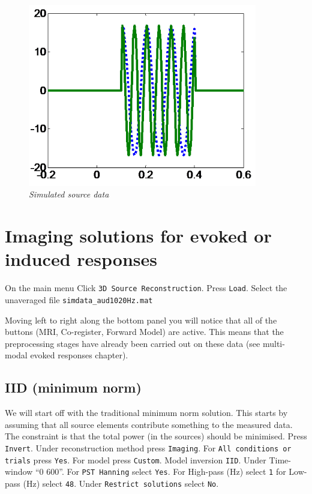 \begin{figure}
\begin{center}
\includegraphics[width=100mm]{meg_sloc/slide1}
\caption{\em Simulated source data \label{meg_sloc:fig:1}}
\end{center}
\end{figure}


\section{Imaging solutions for evoked or induced responses}

On the main menu Click \texttt{3D Source Reconstruction}. Press \texttt{Load}. Select the unaveraged file \texttt{simdata\_aud1020Hz.mat}

Moving left to right along the bottom panel you will notice that all of the buttons (MRI, Co-register, Forward Model) are active. This means that the preprocessing stages have already been carried out on these data (see multi-modal evoked responses chapter).

\subsection{IID (minimum norm)}
We will start off with the traditional minimum norm solution. This starts by assuming that all source elements contribute something to the measured data. The constraint is that the total power (in the sources) should be minimised.
Press \texttt{Invert}. Under reconstruction method press \texttt{Imaging}. For \texttt{All conditions or trials} press \texttt{Yes}. For model press \texttt{Custom}. Model inversion \texttt{IID}. Under Time-window ``0 600''. For \texttt{PST Hanning} select \texttt{Yes}. For High-pass (Hz) select \texttt{1} for Low-pass (Hz) select \texttt{48}. Under \texttt{Restrict solutions} select \texttt{No}. 

